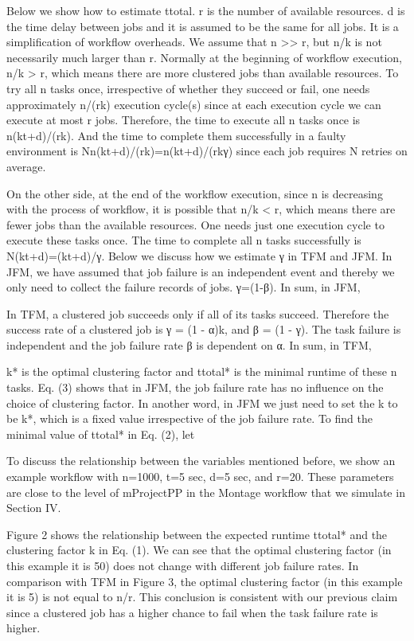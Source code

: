 \documentclass{IOS-Book-Article}
\begin{document}
Below we show how to estimate ttotal. r is the number of available resources. d is the time delay between jobs and it is assumed to be the same for all jobs. It is a simplification of workflow overheads. We assume that n >> r, but n/k is not necessarily much larger than r. Normally at the beginning of workflow execution, n/k > r, which means there are more clustered jobs than available resources. To try all n tasks once, irrespective of whether they succeed or fail, one needs approximately n/(rk) execution cycle(s) since at each execution cycle we can execute at most r jobs. Therefore, the time to execute all n tasks once is n(kt+d)/(rk). And the time to complete them successfully in a faulty environment is Nn(kt+d)/(rk)=n(kt+d)/(rkγ) since each job requires N retries on average.  

On the other side, at the end of the workflow execution, since n is decreasing with the process of workflow, it is possible that n/k < r, which means there are fewer jobs than the available resources. One needs just one execution cycle to execute these tasks once. The time to complete all n tasks successfully is N(kt+d)=(kt+d)/γ. 
Below we discuss how we estimate γ in TFM and JFM. In JFM, we have assumed that job failure is an independent event and thereby we only need to collect the failure records of jobs. γ=(1-β). In sum, in JFM, 

In TFM, a clustered job succeeds only if all of its tasks succeed. Therefore the success rate of a clustered job is γ = (1 - α)k, and β = (1 - γ). The task failure is independent and the job failure rate β is dependent on α. In sum, in TFM,

k* is the optimal clustering factor and ttotal* is the minimal runtime of these n tasks. Eq. (3) shows that in JFM, the job failure rate has no influence on the choice of clustering factor. In another word, in JFM we just need to set the k to be k*, which is a fixed value irrespective of the job failure rate.
To find the minimal value of ttotal* in Eq. (2), let 

To discuss the relationship between the variables mentioned before, we show an example workflow with n=1000, t=5 sec, d=5 sec, and r=20. These parameters are close to the level of mProjectPP in the Montage workflow that we simulate in Section IV. 

Figure 2 shows the relationship between the expected runtime ttotal* and the clustering factor k in Eq. (1). We can see that the optimal clustering factor (in this example it is 50) does not change with different job failure rates. In comparison with TFM in Figure 3, the optimal clustering factor (in this example it is 5) is not equal to n/r. This conclusion is consistent with our previous claim since a clustered job has a higher chance to fail when the task failure rate is higher.
\end{document}
